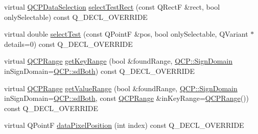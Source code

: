 \begin{DoxyCompactItemize}
\item 
virtual \hyperlink{class_q_c_p_data_selection}{Q\+C\+P\+Data\+Selection} \hyperlink{class_q_c_p_bars_a429d8c3c39972bf6069329175bb85c34}{select\+Test\+Rect} (const Q\+RectF \&rect, bool only\+Selectable) const Q\+\_\+\+D\+E\+C\+L\+\_\+\+O\+V\+E\+R\+R\+I\+DE
\item 
virtual double \hyperlink{class_q_c_p_bars_a7b282a2932c7c0b4a45bd61e8c490153}{select\+Test} (const Q\+PointF \&pos, bool only\+Selectable, Q\+Variant $\ast$details=0) const Q\+\_\+\+D\+E\+C\+L\+\_\+\+O\+V\+E\+R\+R\+I\+DE
\item 
virtual \hyperlink{class_q_c_p_range}{Q\+C\+P\+Range} \hyperlink{class_q_c_p_bars_a3cc3cefe0a486f6cf5793b0bdc7b58cc}{get\+Key\+Range} (bool \&found\+Range, \hyperlink{namespace_q_c_p_afd50e7cf431af385614987d8553ff8a9}{Q\+C\+P\+::\+Sign\+Domain} in\+Sign\+Domain=\hyperlink{namespace_q_c_p_afd50e7cf431af385614987d8553ff8a9a3dee7e9cd2fedce9253b83e172626a6c}{Q\+C\+P\+::sd\+Both}) const Q\+\_\+\+D\+E\+C\+L\+\_\+\+O\+V\+E\+R\+R\+I\+DE
\item 
virtual \hyperlink{class_q_c_p_range}{Q\+C\+P\+Range} \hyperlink{class_q_c_p_bars_a778d219e4d8939b3e794cbad8e373f20}{get\+Value\+Range} (bool \&found\+Range, \hyperlink{namespace_q_c_p_afd50e7cf431af385614987d8553ff8a9}{Q\+C\+P\+::\+Sign\+Domain} in\+Sign\+Domain=\hyperlink{namespace_q_c_p_afd50e7cf431af385614987d8553ff8a9a3dee7e9cd2fedce9253b83e172626a6c}{Q\+C\+P\+::sd\+Both}, const \hyperlink{class_q_c_p_range}{Q\+C\+P\+Range} \&in\+Key\+Range=\hyperlink{class_q_c_p_range}{Q\+C\+P\+Range}()) const Q\+\_\+\+D\+E\+C\+L\+\_\+\+O\+V\+E\+R\+R\+I\+DE
\item 
virtual Q\+PointF \hyperlink{class_q_c_p_bars_a71faeb70a3834f1f391c1a7e11c9fce7}{data\+Pixel\+Position} (int index) const Q\+\_\+\+D\+E\+C\+L\+\_\+\+O\+V\+E\+R\+R\+I\+DE
\end{DoxyCompactItemize}
